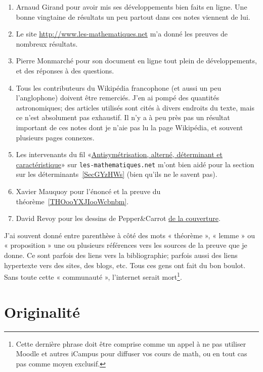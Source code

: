 \begin{enumerate}
            \item
                Arnaud Girand pour avoir mis ses développements bien faits en ligne. Une bonne vingtaine de résultats un peu partout dans ces notes viennent de lui.
            \item
                Le site \url{http://www.les-mathematiques.net} m'a donné les preuves de nombreux résultats.
            \item
                Pierre Monmarché pour son document en ligne tout plein de développements, et des réponses à des questions.
    \item
        Tous les contributeurs du Wikipédia francophone (et aussi un peu l'anglophone) doivent être remerciés. J'en ai pompé des quantités astronomiques; des articles utilisés sont cités à divers endroits du texte, mais ce n'est absolument pas exhaustif. Il n'y a à peu près pas un résultat important de ces notes dont je n'aie pas lu la page Wikipédia, et souvent plusieurs pages connexes.
    \item
        Les intervenants du fil «\href{http://www.les-mathematiques.net/phorum/read.php?2,302266}{Antisymétrisation, alterné, déterminant et caractéristique}» sur \texttt{les-mathematiques.net} m'ont bien aidé pour la section sur les déterminants~\ref{SecGYzHWs} (bien qu'ils ne le savent pas).
    \item
        Xavier Mauquoy pour l'énoncé et la preuve du théorème~\ref{THOooYXJIooWcbnbm}.
    \item
        David Revoy pour les dessins de Pepper\&Carrot \href{https://www.peppercarrot.com/fr/article285/episode-8-pepper-s-birthday-party}{de la couverture}.
\end{enumerate}

J'ai souvent donné entre parenthèse à côté des mots « théorème », « lemme » ou « proposition » une ou plusieurs références vers les sources de la preuve que je donne. Ce sont parfois des liens vers la bibliographie; parfois aussi des liens hypertexte vers des sites, des blogs, etc. Tous ces gens ont fait du bon boulot. Sans toute cette « communauté », l'internet serait mort\footnote{Cette dernière phrase doit être comprise comme un appel à ne pas utiliser Moodle et autres iCampus pour diffuser vos cours de math, ou en tout cas pas comme moyen exclusif.}.

\section{Originalité}

